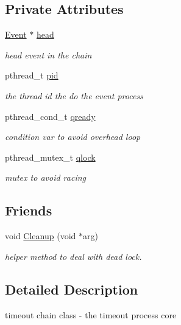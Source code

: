 \subsection*{\-Private \-Attributes}
\begin{DoxyCompactItemize}
\item 
\hyperlink{classEvent}{\-Event} $\ast$ \hyperlink{classEventChain_ae1a1e5817ae1441dd667bf8cc61d2189}{head}
\begin{DoxyCompactList}\small\item\em head event in the chain \end{DoxyCompactList}\item 
pthread\-\_\-t \hyperlink{classEventChain_a18d260ab11be32921c0048f9baee010f}{pid}
\begin{DoxyCompactList}\small\item\em the thread id the do the event process \end{DoxyCompactList}\item 
pthread\-\_\-cond\-\_\-t \hyperlink{classEventChain_a07bb206a91428aa03e3167760357bc57}{qready}
\begin{DoxyCompactList}\small\item\em condition var to avoid overhead loop \end{DoxyCompactList}\item 
pthread\-\_\-mutex\-\_\-t \hyperlink{classEventChain_ade765e56690d9ed14ade46e379a52680}{qlock}
\begin{DoxyCompactList}\small\item\em mutex to avoid racing \end{DoxyCompactList}\end{DoxyCompactItemize}
\subsection*{\-Friends}
\begin{DoxyCompactItemize}
\item 
void \hyperlink{classEventChain_a009f6fec4bfd5adc7c28c7c6acc8d317}{\-Cleanup} (void $\ast$arg)
\begin{DoxyCompactList}\small\item\em helper method to deal with dead lock. \end{DoxyCompactList}\end{DoxyCompactItemize}


\subsection{\-Detailed \-Description}
timeout chain class -\/ the timeout process core 

